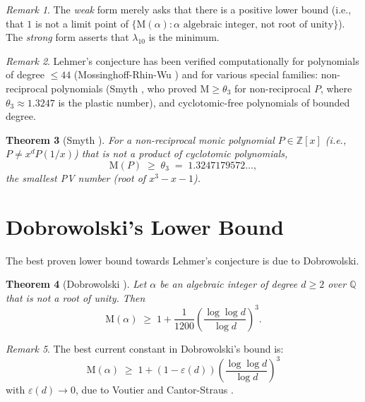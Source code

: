 \documentclass[12pt,a4paper]{amsart}
\newtheorem{theorem}{Theorem}[section]
\theoremstyle{definition}
\theoremstyle{remark}
\newtheorem{remark}[theorem]{Remark}
\newcommand{\Z}{\mathbb{Z}}
\newcommand{\Q}{\mathbb{Q}}
\newcommand{\M}{\mathrm{M}}
\begin{document}
\begin{remark}
  The \emph{weak} form merely asks that there is a positive lower bound (i.e., that $1$
  is not a limit point of $\{\M(\alpha) : \alpha \text{ algebraic integer, not root of unity}\}$).
  The \emph{strong} form asserts that $\lambda_{10}$ is the minimum.
\end{remark}

\begin{remark}
  Lehmer's conjecture has been verified computationally for polynomials of degree
  $\leq 44$ (Mossinghoff-Rhin-Wu \cite{MRW2008}) and for various special families:
  non-reciprocal polynomials (Smyth \cite{Smyth1971}, who proved $\M \geq \theta_3$
  for non-reciprocal $P$, where $\theta_3 \approx 1.3247$ is the plastic number),
  and cyclotomic-free polynomials of bounded degree.
\end{remark}

\begin{theorem}[Smyth \cite{Smyth1971}]
  For a non-reciprocal monic polynomial $P \in \Z[x]$ (i.e., $P \neq x^d P(1/x)$)
  that is not a product of cyclotomic polynomials,
  \[
    \M(P) \;\geq\; \theta_3 \;=\; 1.3247179572\ldots,
  \]
  the smallest PV number (root of $x^3 - x - 1$).
\end{theorem}

\section{Dobrowolski's Lower Bound}\label{sec:dobrowolski}

The best proven lower bound towards Lehmer's conjecture is due to Dobrowolski.

\begin{theorem}[Dobrowolski \cite{Dobrowolski1979}]\label{thm:dobro}
  Let $\alpha$ be an algebraic integer of degree $d \geq 2$ over $\Q$ that is not a root
  of unity. Then
  \[
    \M(\alpha) \;\geq\; 1 + \frac{1}{1200}\left(\frac{\log\log d}{\log d}\right)^3.
  \]
\end{theorem}

\begin{remark}
  The best current constant in Dobrowolski's bound is:
  \[
    \M(\alpha) \;\geq\; 1 + \left(1 - \varepsilon(d)\right)
    \left(\frac{\log\log d}{\log d}\right)^3
  \]
  with $\varepsilon(d) \to 0$, due to Voutier \cite{Voutier1996} and
  Cantor-Straus \cite{CantorStraus1982}.
\end{remark}
\end{document}
